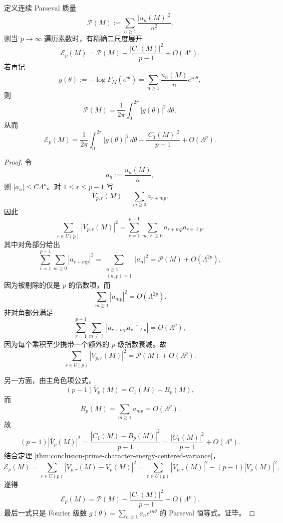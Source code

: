 \begin{theorem}\label{thm:conclusion-large-prime-torsion-energy-two-scale-parseval}
定义连续 Parseval 质量
\[
\mathcal P(M):=\sum_{n\ge 1}\frac{|u_n(M)|^2}{n^2}.
\]
则当 \(p\to\infty\) 遍历素数时，有精确二尺度展开
\[
\mathcal E_p(M)
=
\mathcal P(M)-\frac{|C_1(M)|^2}{p-1}+O(\Lambda^p).
\]
若再记
\[
g(\theta):=-\log F_M(e^{i\theta})=\sum_{n\ge 1}\frac{u_n(M)}{n}e^{in\theta},
\]
则
\[
\mathcal P(M)=\frac1{2\pi}\int_0^{2\pi}|g(\theta)|^2\,d\theta,
\]
从而
\[
\mathcal E_p(M)
=
\frac1{2\pi}\int_0^{2\pi}|g(\theta)|^2\,d\theta
-\frac{|C_1(M)|^2}{p-1}
+O(\Lambda^p).
\]
\end{theorem}
\begin{proof}
令
\[
a_n:=\frac{u_n(M)}{n},
\]
则 \(|a_n|\le C\Lambda^n\)。对 \(1\le r\le p-1\) 写
\[
V_{p,r}(M)=\sum_{m\ge 0}a_{r+mp}.
\]
因此
\[
\sum_{r\in U(p)}|V_{p,r}(M)|^2
=
\sum_{r=1}^{p-1}\sum_{m,\ell\ge 0}a_{r+mp}\overline{a_{r+\ell p}}.
\]
其中对角部分给出
\[
\sum_{r=1}^{p-1}\sum_{m\ge 0}|a_{r+mp}|^2
=
\sum_{\substack{n\ge 1\\(n,p)=1}}|a_n|^2
=
\mathcal P(M)+O(\Lambda^{2p}),
\]
因为被剔除的仅是 \(p\) 的倍数项，而
\[
\sum_{m\ge 1}|a_{mp}|^2=O(\Lambda^{2p}).
\]
非对角部分满足
\[
\sum_{r=1}^{p-1}\sum_{m\neq \ell}|a_{r+mp}\overline{a_{r+\ell p}}|
=
O(\Lambda^p),
\]
因为每个乘积至少携带一个额外的 \(p\)-级指数衰减。故
\[
\sum_{r\in U(p)}|V_{p,r}(M)|^2
=
\mathcal P(M)+O(\Lambda^p).
\]

另一方面，由主角色项公式，
\[
(p-1)\bar V_p(M)=C_1(M)-B_p(M),
\]
而
\[
B_p(M)=\sum_{m\ge 1}a_{mp}=O(\Lambda^p).
\]
故
\[
(p-1)|\bar V_p(M)|^2
=
\frac{|C_1(M)-B_p(M)|^2}{p-1}
=
\frac{|C_1(M)|^2}{p-1}+O(\Lambda^p).
\]
结合定理 \ref{thm:conclusion-prime-character-energy-centered-variance}，
\[
\mathcal E_p(M)
=
\sum_{r\in U(p)}|V_{p,r}(M)-\bar V_p(M)|^2
=
\sum_{r\in U(p)}|V_{p,r}(M)|^2-(p-1)|\bar V_p(M)|^2,
\]
遂得
\[
\mathcal E_p(M)=\mathcal P(M)-\frac{|C_1(M)|^2}{p-1}+O(\Lambda^p).
\]
最后一式只是 Fourier 级数 \(g(\theta)=\sum_{n\ge 1}a_ne^{in\theta}\) 的 Parseval 恒等式。证毕。
\end{proof}


